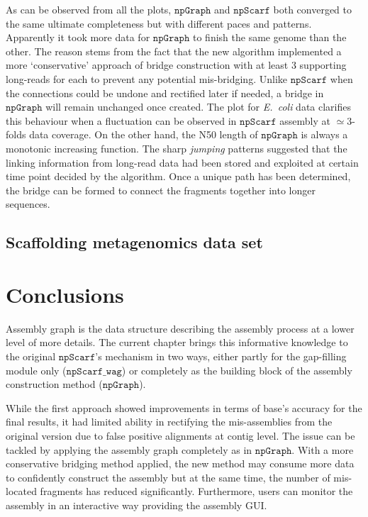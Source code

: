\documentclass[10pt,twocolumn,twoside]{genpaper}
\newcommand{\npscarf}{$\mathtt{npScarf}$}
\newcommand{\npscarfg}{$\mathtt{npScarf\_wag}$}
\newcommand{\npgraph}{$\mathtt{npGraph}$}
\newcommand{\ec}{\emph{E.~coli}}
\begin{document}
As can be observed from all the plots, \npgraph{} and \npscarf{} both converged to the same ultimate completeness but with different paces and patterns.
Apparently it took more data for \npgraph{} to finish the same genome than the other.
The reason stems from the fact that the new algorithm implemented a more `conservative' approach of bridge construction with at least 3 supporting long-reads for each to prevent any potential mis-bridging. 
Unlike \npscarf{} when the connections could be undone and rectified later if needed, a bridge in \npgraph{} will remain unchanged once created.
The plot for \ec{} data clarifies this behaviour when a fluctuation can be observed in \npscarf{} assembly at $\simeq 3$-folds data coverage.
On the other hand, the N50 length of \npgraph{} is always a monotonic increasing function. 
The sharp \emph{jumping} patterns suggested that the linking information from long-read data had been stored and exploited at certain time point decided by the algorithm.
Once a unique path has been determined, the bridge can be formed to connect the fragments together into longer sequences.

\subsection*{Scaffolding metagenomics data set}

\section*{Conclusions}
Assembly graph is the data structure describing the assembly process at a lower level of more details.
The current chapter brings this informative knowledge to the original \npscarf{}'s mechanism in two ways, either partly for the gap-filling module only (\npscarfg{}) or completely as the building block of the assembly construction method (\npgraph{}).

While the first approach showed improvements in terms of base's accuracy for the final results, it had limited ability in rectifying the mis-assemblies from the original version due to false positive alignments at contig level.
The issue can be tackled by applying the assembly graph completely as in \npgraph{}.
With a more conservative bridging method applied, the new method may consume more data to confidently construct the assembly but at the same time, the number of mis-located fragments has reduced significantly.
Furthermore, users can monitor the assembly in an interactive way providing the assembly GUI.
\end{document}
